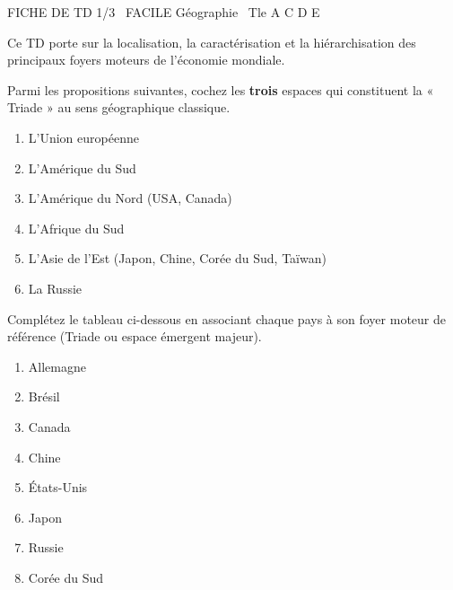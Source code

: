 \documentclass[11pt]{article}
\begin{document}
\begin{tcolorbox}[enhanced,colback=popink,colframe=popink,arc=10pt,boxrule=0pt,left=12pt,right=12pt,top=9pt,bottom=9pt]
{\color{white}\popxbold\small FICHE DE TD 1/3 \textbullet\ FACILE \hfill Géographie \textbullet\ Tle A C D E\par}
\end{tcolorbox}
\vspace{4pt}
Ce TD porte sur la localisation, la caractérisation et la hiérarchisation des principaux foyers moteurs de l'économie mondiale.

\begin{exercice}
Parmi les propositions suivantes, cochez les \textbf{trois} espaces qui constituent la « Triade » au sens géographique classique.
\begin{enumerate}
    \item L'Union européenne
    \item L'Amérique du Sud
    \item L'Amérique du Nord (USA, Canada)
    \item L'Afrique du Sud
    \item L'Asie de l'Est (Japon, Chine, Corée du Sud, Taïwan)
    \item La Russie
\end{enumerate}
\end{exercice}

\begin{exercice}
Complétez le tableau ci-dessous en associant chaque pays à son foyer moteur de référence (Triade ou espace émergent majeur).
\begin{enumerate}
    \item Allemagne \hfill \dotfill
    \item Brésil \hfill \dotfill
    \item Canada \hfill \dotfill
    \item Chine \hfill \dotfill
    \item États-Unis \hfill \dotfill
    \item Japon \hfill \dotfill
    \item Russie \hfill \dotfill
    \item Corée du Sud \hfill \dotfill
\end{enumerate}
\end{exercice}
\end{document}
